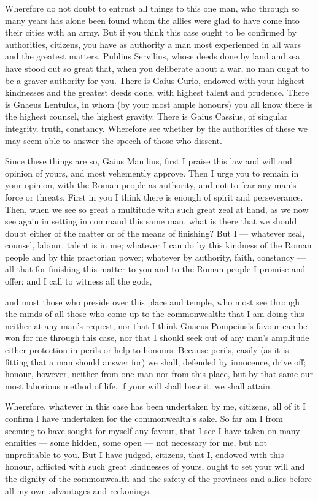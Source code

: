  Wherefore do not doubt to entrust all things to this one man, who through so many years has alone been found whom the allies were glad to have come into their cities with an army. But if you think this case ought to be confirmed by authorities, citizens, you have as authority a man most experienced in all wars and the greatest matters, Publius Servilius, whose deeds done by land and sea have stood out so great that, when you deliberate about a war, no man ought to be a graver authority for you. There is Gaius Curio, endowed with your highest kindnesses and the greatest deeds done, with highest talent and prudence. There is Gnaeus Lentulus, in whom (by your most ample honours) you all know there is the highest counsel, the highest gravity. There is Gaius Cassius, of singular integrity, truth, constancy. Wherefore see whether by the authorities of these we may seem able to answer the speech of those who dissent.

 Since these things are so, Gaius Manilius, first I praise this law and will and opinion of yours, and most vehemently approve. Then I urge you to remain in your opinion, with the Roman people as authority, and not to fear any man's force or threats. First in you I think there is enough of spirit and perseverance. Then, when we see so great a multitude with such great zeal at hand, as we now see again in setting in command this same man, what is there that we should doubt either of the matter or of the means of finishing? But I --- whatever zeal, counsel, labour, talent is in me; whatever I can do by this kindness of the Roman people and by this praetorian power; whatever by authority, faith, constancy --- all that for finishing this matter to you and to the Roman people I promise and offer; and I call to witness all the gods,

 and most those who preside over this place and temple, who most see through the minds of all those who come up to the commonwealth: that I am doing this neither at any man's request, nor that I think Gnaeus Pompeius's favour can be won for me through this case, nor that I should seek out of any man's amplitude either protection in perils or help to honours. Because perils, easily (as it is fitting that a man should answer for) we shall, defended by innocence, drive off; honour, however, neither from one man nor from this place, but by that same our most laborious method of life, if your will shall bear it, we shall attain.

 Wherefore, whatever in this case has been undertaken by me, citizens, all of it I confirm I have undertaken for the commonwealth's sake. So far am I from seeming to have sought for myself any favour, that I see I have taken on many enmities --- some hidden, some open --- not necessary for me, but not unprofitable to you. But I have judged, citizens, that I, endowed with this honour, afflicted with such great kindnesses of yours, ought to set your will and the dignity of the commonwealth and the safety of the provinces and allies before all my own advantages and reckonings.

